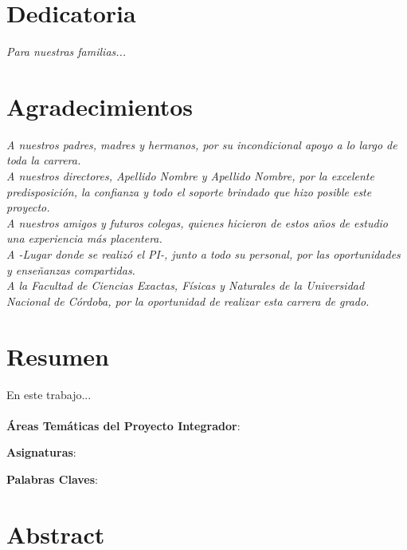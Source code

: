 \documentclass[12pt,A4paper,titlepage, twoside, openright]{report}
\begin{document}
\chapter*{Dedicatoria}

\begin{flushright}
	\textit{Para nuestras familias...}
\end{flushright}


\chapter*{Agradecimientos}

\textit{A nuestros padres, madres y hermanos, por su incondicional apoyo a lo largo de toda la carrera.}
\\

\textit{A nuestros directores, Apellido Nombre y Apellido Nombre, por la excelente predisposición, la confianza y todo el soporte brindado que hizo posible este proyecto.}
\\

\textit{A nuestros amigos y futuros colegas, quienes hicieron de estos años de estudio una experiencia más placentera.}
\\

\textit{A -Lugar donde se realizó el PI-, junto a todo su personal, por las oportunidades y enseñanzas compartidas.}
\\

\textit{A la Facultad de Ciencias Exactas, Físicas y Naturales de la Universidad Nacional de Córdoba, por la oportunidad de realizar esta carrera de grado.}


\chapter*{Resumen}

En este trabajo...
\\
\\

\textbf{Áreas Temáticas del Proyecto Integrador}: 

\textbf{Asignaturas}: 

\textbf{Palabras Claves}:

\chapter*{Abstract}
\end{document}
